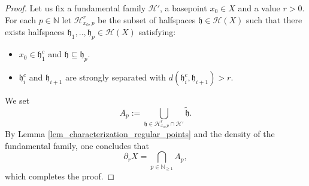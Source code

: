 \documentclass{amsart}
\numberwithin{equation}{section}
\newcommand{\HH}{\mathcal{H}}     %
\newcommand{\hh}{\mathfrak{h}}    %
\newcommand{\NN}{\mathbb{N}}      %
\theoremstyle{definition}
\begin{document}
\begin{proof}
 Let us fix a fundamental family $\HH'$, a basepoint $x_0\in X$ and a value $r>0$. For each $p\in\NN$ let $\HH_{x_0,p}^r$ be the subset of halfspaces $\hh\in\HH(X)$ such that there exists halfspaces $\hh_1,..,\hh_p\in\HH(X)$ satisfying:
 \begin{itemize}
     \item $x_0\in \hh_1^c$ and $\hh\subseteq \hh_p$.
     \item $\hh_i^c$ and $\hh_{i+1}$ are strongly separated with $d(\hh_i^c,\hh_{i+1})>r$.
 \end{itemize}
 We set 
 \[ 
 A_p:=\bigcup_{\hh\in\HH_{x_0,p}^r\cap\HH'}\tilde{\hh}. 
 \]
 By Lemma \ref{lem_characterization_regular_points} and the density of the fundamental family, one concludes that 
 \[
 \partial_r X=\bigcap_{p\in\NN_{\geq 1}} A_p,
 \]
which completes the proof.
\end{proof}

\end{document}
